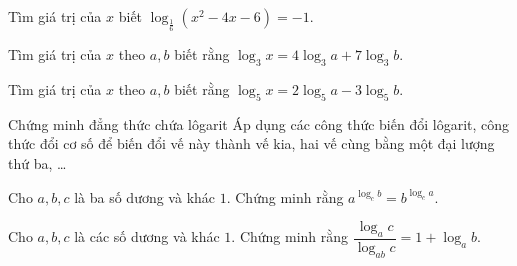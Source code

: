 \begin{bt}%
    Tìm giá trị của $x$ biết $\log_{\tfrac{1}{6}}\left(x^2-4x-6\right)=-1$.
\end{bt}

\begin{bt}%
    Tìm giá trị của $x$ theo $a,b$ biết rằng $\log_3x=4\log_3a+7\log_3b$.
\end{bt}

\begin{bt}%
    Tìm giá trị của $x$ theo $a,b$ biết rằng $\log_5x=2\log_5a-3\log_5b$.
\end{bt}
\begin{dang}{Chứng minh đẳng thức chứa lôgarit}
    Áp dụng các công thức biến đổi lôgarit, công thức đổi cơ số để biến đổi vế này thành vế kia, hai vế cùng bằng một đại lượng thứ ba, \ldots
\end{dang}

\begin{vd}%
    Cho $a,b,c$ là ba số dương và khác $1$. Chứng minh rằng $a^{\log_cb}=b^{\log_ca}$.
\end{vd}

\begin{vd}%
    Cho $a,b,c$ là các số dương và khác $1$. Chứng minh rằng $\dfrac{\log_ac}{\log_{ab}c}=1+\log_ab$.
\end{vd}

